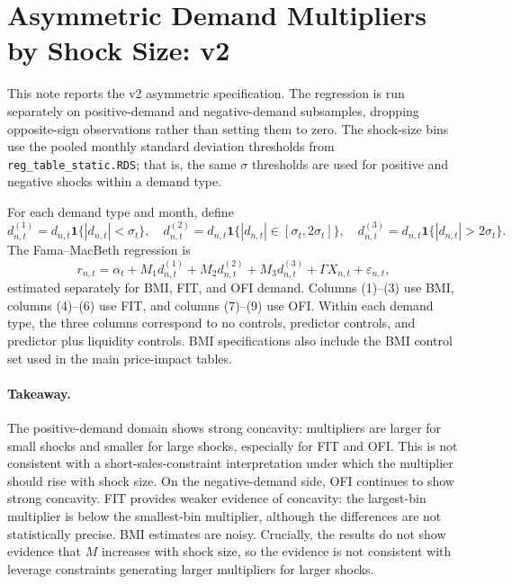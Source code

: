 \documentclass[11pt]{article}
\begin{document}
\section*{Asymmetric Demand Multipliers by Shock Size: v2}

This note reports the v2 asymmetric specification. The regression is run
separately on positive-demand and negative-demand subsamples, dropping
opposite-sign observations rather than setting them to zero. The shock-size
bins use the pooled monthly standard deviation thresholds from
\texttt{reg\_table\_static.RDS}; that is, the same $\sigma$ thresholds are used
for positive and negative shocks within a demand type.

For each demand type and month, define
\[
d^{(1)}_{n,t} = d_{n,t}\mathbf{1}\{|d_{n,t}| < \sigma_t\}, \quad
d^{(2)}_{n,t} = d_{n,t}\mathbf{1}\{|d_{n,t}| \in [\sigma_t,2\sigma_t]\}, \quad
d^{(3)}_{n,t} = d_{n,t}\mathbf{1}\{|d_{n,t}| > 2\sigma_t\}.
\]
The Fama--MacBeth regression is
\[
r_{n,t} = \alpha_t + M_1 d^{(1)}_{n,t}
        + M_2 d^{(2)}_{n,t}
        + M_3 d^{(3)}_{n,t}
        + \Gamma X_{n,t} + \varepsilon_{n,t},
\]
estimated separately for BMI, FIT, and OFI demand. Columns (1)--(3) use BMI,
columns (4)--(6) use FIT, and columns (7)--(9) use OFI. Within each demand
type, the three columns correspond to no controls, predictor controls, and
predictor plus liquidity controls. BMI specifications also include the BMI
control set used in the main price-impact tables.

\paragraph{Takeaway.}
The positive-demand domain shows strong concavity: multipliers are larger for
small shocks and smaller for large shocks, especially for FIT and OFI. This is
not consistent with a short-sales-constraint interpretation under which the
multiplier should rise with shock size. On the negative-demand side, OFI
continues to show strong concavity. FIT provides weaker evidence of concavity:
the largest-bin multiplier is below the smallest-bin multiplier, although the
differences are not statistically precise. BMI estimates are noisy. Crucially,
the results do not show evidence that $M$ increases with shock size, so the
evidence is not consistent with leverage constraints generating larger
multipliers for larger shocks.
\end{document}
